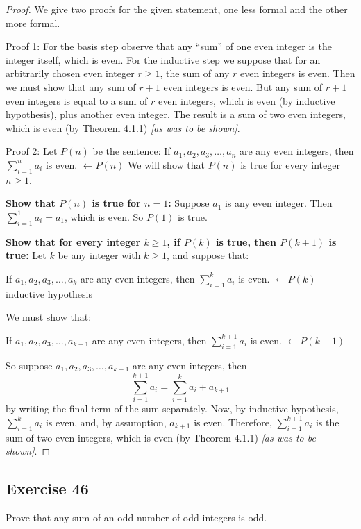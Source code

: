 \documentclass[14pt]{extarticle}
\newcommand{\from}{\leftarrow}
\newcommand{\cy}{\color{cyan}}
\begin{document}
\begin{proof}
We give two proofs for the given statement, one less formal and the other more formal.

\underline{Proof 1:} For the basis step observe that any “sum” of one even integer is the integer itself, which is 
even. For the inductive step we suppose that for an arbitrarily chosen even integer \(r \geq 1\), the sum of 
any $r$ even integers is even. Then we must show that any sum of $r + 1$ even integers is even. But any sum of 
$r + 1$ even integers is equal to a sum of $r$ even integers, which is even (by inductive hypothesis), plus 
another even integer. The result is a sum of two even integers, which is even (by Theorem 4.1.1) 
{\it [as was to be shown]}.

\underline{Proof 2:} Let $P(n)$ be the sentence: If \(a_1, a_2, a_3, \ldots, a_n\) are any even integers, then 
\(\sum_{i=1}^n a_i\) is even. {\cy \(\from P(n)\)} We will show that $P(n)$ is true for every integer \(n \geq 1\). 

{\bf Show that $P(n)$ is true for $n = 1$:} Suppose $a_1$ is any even integer. Then \(\sum_{i = 1}^1 a_i = a_1\), 
which is even. So $P(1)$ is true. 

{\bf Show that for every integer \(k \geq 1\), if $P(k)$ is true, then $P(k + 1)$ is true:} Let $k$ be any integer with 
\(k \geq 1\), and suppose that:

If \(a_1, a_2, a_3, \ldots, a_k\) are any even integers, then \(\sum_{i = 1}^k a_i\) is even. {\cy \(\from P(k)\) inductive hypothesis}  

We must show that:

If \(a_1, a_2, a_3, \ldots, a_{k+1}\) are any even integers, then \(\sum_{i = 1}^{k+1} a_i\) is even. 
{\cy \(\from P(k + 1)\)} 

So suppose \(a_1, a_2, a_3, \ldots, a_{k+1}\) are any even integers, then 
\[
\sum_{i = 1}^{k+1} a_i = \sum_{i = 1}^k a_i + a_{k+1}
\]
by writing the final term of the sum separately. Now, by inductive hypothesis, \(\sum_{i = 1}^k a_i\) is even, and, 
by assumption, $a_{k+1}$ is even. Therefore, \(\sum_{i = 1}^{k+1} a_i \) is the sum of two even integers, which is 
even (by Theorem 4.1.1) {\it [as was to be shown]}.
\end{proof}

\subsection{Exercise 46}
Prove that any sum of an odd number of odd integers is odd.
\end{document}
